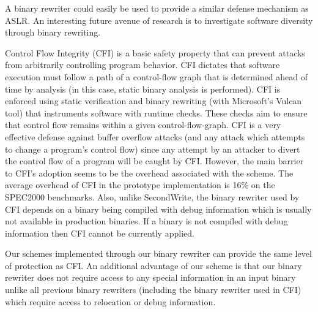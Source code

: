 %


A binary rewriter could easily be used to provide a similar defense
mechanism as ASLR. An interesting future avenue of research is to
investigate software diversity through binary rewriting.

 Control Flow Integrity (CFI)
\cite{cfi-05} is a basic safety property that can prevent attacks from
arbitrarily controlling program behavior. CFI dictates that software
execution must follow a path of a control-flow graph that is
determined ahead of time by analysis (in this case, static binary
analysis is performed). CFI is enforced using static verification and
binary rewriting (with Microsoft's Vulcan \cite{vulcan} tool) that
instruments software with runtime checks. These checks aim to ensure
that control flow remains within a given control-flow-graph. CFI is a
very effective defense against buffer overflow attacks (and any attack
which attempts to change a program's control flow) since any attempt
by an attacker to divert the control flow of a program will be caught
by CFI. However, the main barrier to CFI's adoption seems to be the
overhead associated with the scheme. The average overhead of CFI in
the prototype implementation is 16\% on the SPEC2000 benchmarks. Also, unlike SecondWrite,
the binary rewriter used by CFI depends on a binary being compiled
with debug information which is usually not available in production
binaries. If a binary is not compiled with debug information then CFI
cannot be currently applied.

Our schemes implemented through our binary rewriter can provide the
same level of protection as CFI. An additional advantage of our scheme
is that our binary rewriter does not require access to any special
information in an input binary unlike all previous binary rewriters
(including the binary rewriter used in CFI) which require access to
relocation or debug information.

